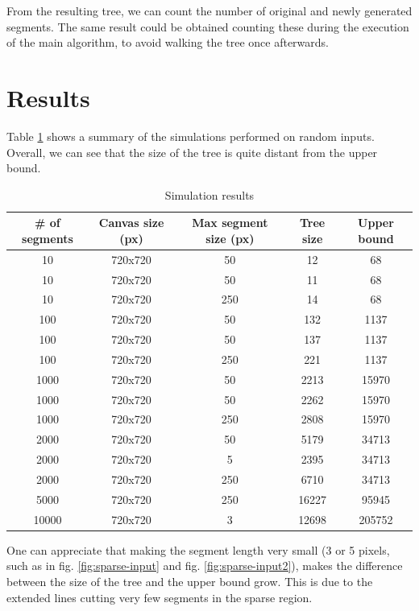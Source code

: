 \documentclass[12pt,a4paper]{article}
\begin{document}
From the resulting tree, we can count the number of original and newly
generated segments. The same result could be obtained counting these
during the execution of the main algorithm, to avoid walking the tree
once afterwards.

\section{Results}

Table \ref{tab:results} shows a summary of the simulations performed
on random inputs. Overall, we can see that the size of the tree is
quite distant from the upper bound.

\begin{table}[ht!]
  \centering
  \begin{tabular}[center]{||c|c|c|c|c||}
    \hline
    \# of segments & Canvas size (px) & Max segment size (px) & Tree size
    & Upper bound \\
    \hline \hline
    10 & 720x720 & 50 & 12 & 68 \\
    10 & 720x720 & 50 & 11 & 68 \\
    10 & 720x720 & 250 & 14 & 68 \\
    100 & 720x720 & 50 & 132 & 1137 \\
    100 & 720x720 & 50 & 137 & 1137 \\
    100 & 720x720 & 250 & 221 & 1137 \\
    1000 & 720x720 & 50 & 2213 & 15970 \\
    1000 & 720x720 & 50 & 2262 & 15970 \\
    1000 & 720x720 & 250 & 2808 & 15970 \\
    2000 & 720x720 & 50 & 5179 & 34713 \\
    2000 & 720x720 & 5 & 2395 & 34713 \\
    2000 & 720x720 & 250 & 6710 & 34713 \\
    5000 & 720x720 & 250 & 16227 & 95945 \\
    10000 & 720x720 & 3 & 12698 & 205752 \\
    \hline
  \end{tabular}
  \caption{Simulation results}
  \label{tab:results}
\end{table}

One can appreciate that making the segment length very small (3 or 5
pixels, such as in fig. \ref{fig:sparse-input} and
fig. \ref{fig:sparse-input2}), makes the difference between the size
of the tree and the upper bound grow. This is due to the extended
lines cutting very few segments in the sparse region.
\end{document}
